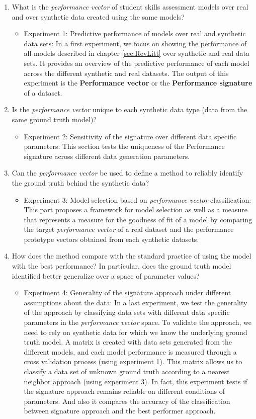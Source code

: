 \begin{enumerate}
\item What is the \textit{performance vector} of student skills assessment models over real and over synthetic data created using the same models?
\begin{itemize}
\item Experiment 1: Predictive performance of models over real and synthetic data sets: In a first experiment, we focus on showing the performance of all models described in chapter \ref{sec:RevLitt} over synthetic and real data sets.  It provides an overview of the predictive performance of each model across the different synthetic and real datasets. The output of this experiment is the \textbf{Performance vector} or the \textbf{Performance signature} of a dataset.
\end{itemize}
\item Is the \textit{performance vector} unique to each synthetic data type (data from the same ground truth model)?
\begin{itemize}
\item Experiment 2: Sensitivity of the signature over different data specific parameters: This section tests the uniqueness of the Performance signature across different data generation parameters.
\end{itemize}
\item Can the \textit{performance vector} be used to define a method to reliably identify the ground truth behind the synthetic data?
\begin{itemize}
\item Experiment 3: Model selection based on \textit{performance vector} classification: This part proposes a framework for model selection as well as a measure that represents a measure for the goodness of fit of a model by comparing the target \textit{performance vector} of a real dataset and the performance prototype vectors obtained from each synthetic datasets.
\end{itemize}
\item How does the method compare with the standard practice of using the model with the best performance?  In particular, does the ground truth model identified better generalize over a space of parameter values?
\begin{itemize}
\item Experiment 4: Generality of the signature approach under different assumptions about the data: In a last experiment, we test the generality of the approach by classifying data sets with different data specific parameters in the \textit{performance vector} space. To validate the approach, we need to rely on synthetic data for which we know the underlying ground truth model.  A matrix is created with data sets generated from the different models, and each model performance is measured through a cross validation process (using experiment 1). This matrix allows us to classify a data set of unknown ground truth according to a nearest neighbor approach (using experiment 3). In fact, this experiment tests if the signature approach remains reliable on different conditions of parameters. And also it compares the accuracy of the classification between signature approach and the best performer approach. 

\end{itemize}
\end{enumerate}
